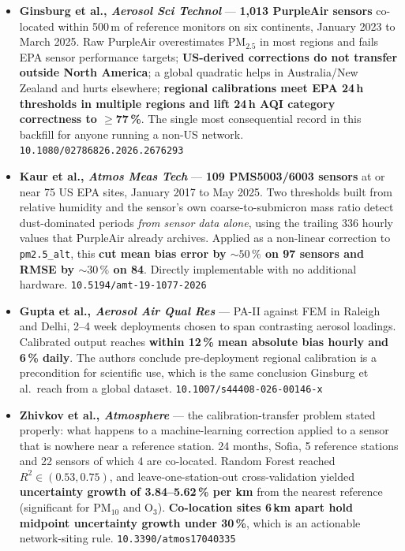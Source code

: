 \documentclass[10pt]{article}
\begin{document}
\vspace{2mm}
\footnotesize
\begin{itemize}\itemsep2pt
\item \textbf{Ginsburg et al., \textit{Aerosol Sci Technol}} ---
\textbf{1,013 PurpleAir sensors} co-located within 500\,m of reference monitors on six
continents, January 2023 to March 2025. Raw PurpleAir overestimates PM$_{2.5}$ in most
regions and fails EPA sensor performance targets; \textbf{US-derived corrections do not
transfer outside North America}; a global quadratic helps in Australia/New Zealand and
hurts elsewhere; \textbf{regional calibrations meet EPA 24\,h thresholds in multiple
regions and lift 24\,h AQI category correctness to $\ge$77\,\%}. The single most
consequential record in this backfill for anyone running a non-US network.
\texttt{10.1080/02786826.2026.2676293}

\item \textbf{Kaur et al., \textit{Atmos Meas Tech}} --- \textbf{109 PMS5003/6003 sensors}
at or near 75 US EPA sites, January 2017 to May 2025. Two thresholds built from relative
humidity and the sensor's own coarse-to-submicron mass ratio detect dust-dominated
periods \emph{from sensor data alone}, using the trailing 336 hourly values that
PurpleAir already archives. Applied as a non-linear correction to \texttt{pm2.5\_alt},
this \textbf{cut mean bias error by ${\sim}50\,\%$ on 97 sensors and RMSE by
${\sim}30\,\%$ on 84}. Directly implementable with no additional hardware.
\texttt{10.5194/amt-19-1077-2026}

\item \textbf{Gupta et al., \textit{Aerosol Air Qual Res}} --- PA-II against FEM in
Raleigh and Delhi, 2--4 week deployments chosen to span contrasting aerosol loadings.
Calibrated output reaches \textbf{within 12\,\% mean absolute bias hourly and 6\,\%
daily}. The authors conclude pre-deployment regional calibration is a precondition for
scientific use, which is the same conclusion Ginsburg et al.\ reach from a global
dataset. \texttt{10.1007/s44408-026-00146-x}

\item \textbf{Zhivkov et al., \textit{Atmosphere}} --- the calibration-transfer problem
stated properly: what happens to a machine-learning correction applied to a sensor that
is nowhere near a reference station. 24 months, Sofia, 5 reference stations and 22
sensors of which 4 are co-located. Random Forest reached $R^2\in(0.53,0.75)$, and
leave-one-station-out cross-validation yielded \textbf{uncertainty growth of
3.84--5.62\,\% per km} from the nearest reference (significant for PM$_{10}$ and O$_3$).
\textbf{Co-location sites 6\,km apart hold midpoint uncertainty growth under 30\,\%},
which is an actionable network-siting rule. \texttt{10.3390/atmos17040335}


\end{itemize}
\end{document}

